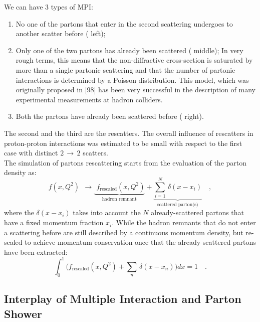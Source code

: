 \noindent We can have 3 types of MPI:
\begin{enumerate}
	\item No one of the partons that enter in the second scattering undergoes to another scatter before ( left);
	\item Only one of the two partons has already been scattered ( middle); In very rough terms, this means that the non-diffractive
cross-section is saturated by more than a single partonic scattering and that the number of partonic
interactions is determined by a Poisson distribution. This model, which was originally proposed in [98]
has been very successful in the description of many experimental measurements at hadron colliders.
	\item Both the partons have already been scattered before ( right). 
\end{enumerate}
The second and the third are the rescatters. The overall influence of rescatters in proton-proton interactions was estimated to be small with respect to the first case with distinct $2\,\rightarrow\,2$  scatters. 
\\
The simulation of partons rescattering starts from the evaluation of the parton density as:
\begin{equation}
	f(x,Q^2)\ \  \longrightarrow\! \underbrace{\phantom{\Bigg(} f_{\text{rescaled}}(x,Q^2)}_{\text{hadron remnant}}+\underbrace{\displaystyle\sum_{i=1}^N \,\delta(x-x_i)}_{\text{scattered parton(s)}}\quad,
\end{equation} 
where the $\delta(x-x_i)$ takes into account the $N$  already-scattered partons that have a fixed momentum fraction $x_i$. While the hadron remnants that do not enter a scattering before are still described by a continuous momentum density, but re-scaled to achieve momentum conservation once that the already-scattered partons have been extracted:
\begin{equation}	\displaystyle\int_0^1 \bigg( f_{\text{rescaled}}(x,Q^2) +\displaystyle\sum_n \,\delta(x-x_n) \bigg)dx=1\quad.
\end{equation}


\subsection{Interplay of Multiple Interaction and Parton Shower}

